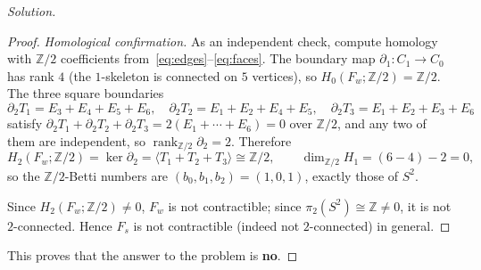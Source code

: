 \documentclass{amsart}
\theoremstyle{definition}
\newcommand{\ZZ}{\mathbb{Z}}
\begin{document}
\begin{proof}[Solution]
\begin{proof}
\emph{Homological confirmation.} As an independent check, compute homology with $\ZZ/2$
coefficients from~\eqref{eq:edges}--\eqref{eq:faces}. The boundary map
$\partial_1:C_1\to C_0$ has rank $4$ (the $1$-skeleton is connected on $5$ vertices), so
$H_0(F_w;\ZZ/2)=\ZZ/2$. The three square boundaries
\[
\partial_2T_1=E_3+E_4+E_5+E_6,\quad
\partial_2T_2=E_1+E_2+E_4+E_5,\quad
\partial_2T_3=E_1+E_2+E_3+E_6
\]
satisfy $\partial_2T_1+\partial_2T_2+\partial_2T_3=2(E_1+\cdots+E_6)=0$ over $\ZZ/2$, and any
two of them are independent, so $\operatorname{rank}_{\ZZ/2}\partial_2=2$. Therefore
\[
H_2(F_w;\ZZ/2)=\ker\partial_2=\langle T_1+T_2+T_3\rangle\cong\ZZ/2,\qquad
\dim_{\ZZ/2}H_1=(6-4)-2=0,
\]
so the $\ZZ/2$-Betti numbers are $(b_0,b_1,b_2)=(1,0,1)$, exactly those of $S^2$.

Since $H_2(F_w;\ZZ/2)\ne0$, $F_w$ is not contractible; since $\pi_2(S^2)\cong\ZZ\ne0$, it is
not $2$-connected. Hence $F_s$ is not contractible (indeed not $2$-connected) in general.
\end{proof}

This proves that the answer to the problem is \textbf{no}.
\end{proof}
\end{document}
